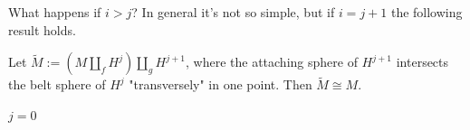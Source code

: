 \noindent What happens if $i>j$? In general it's not so simple, but if $i=j+1$ the following result holds.
\begin{prop}
    Let $\tilde M := (M \coprod_f H^j) \coprod_g H^{j+1}$, where the attaching sphere of $H^{j+1}$ intersects the belt sphere of $H^j$ "transversely" in one point. Then $\tilde M \cong M$.
\end{prop}
\begin{ex}
    $j=0$ %
\end{ex}



